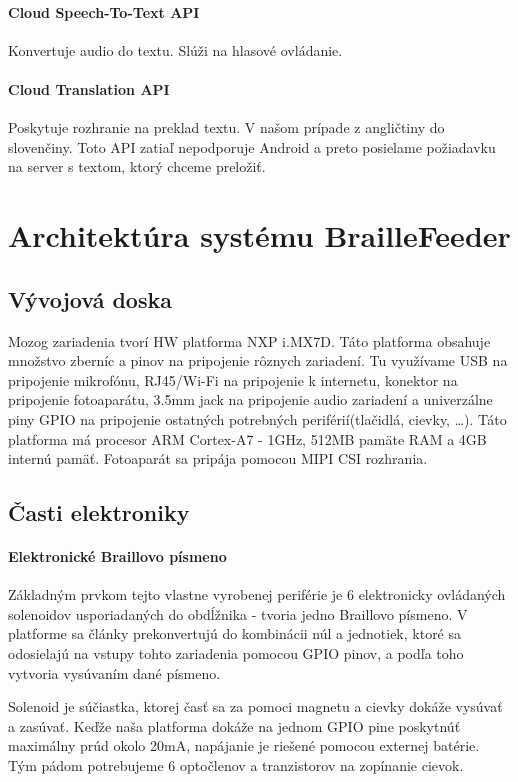 \documentclass{template/socthesis}
\begin{document}
\subsubsection{Cloud Speech-To-Text API}
Konvertuje audio do textu. Slúži na hlasové ovládanie.
\subsubsection{Cloud Translation API}
Poskytuje rozhranie na preklad textu. V našom prípade z angličtiny do slovenčiny. Toto API zatiaľ nepodporuje Android a preto posielame požiadavku na server s textom, ktorý chceme preložiť.
\newpage

\chapter{Architektúra systému BrailleFeeder}

\section{Vývojová doska}
Mozog zariadenia tvorí HW platforma NXP i.MX7D. Táto platforma obsahuje množstvo zberníc a pinov na pripojenie rôznych zariadení. Tu využívame USB na pripojenie mikrofónu, RJ45/Wi-Fi na pripojenie k internetu, konektor na pripojenie fotoaparátu, 3.5mm jack na pripojenie audio zariadení a univerzálne piny GPIO na pripojenie ostatných potrebných periférií(tlačidlá, cievky, …).
Táto platforma má procesor ARM Cortex-A7 - 1GHz, 512MB pamäte RAM a 4GB internú pamäť. Fotoaparát sa pripája pomocou MIPI CSI rozhrania.

\section{Časti elektroniky}
\subsubsection{Elektronické Braillovo písmeno}
Základným prvkom tejto vlastne vyrobenej periférie je 6 elektronicky ovládaných solenoidov usporiadaných do obdĺžnika - tvoria jedno Braillovo písmeno. V platforme sa články prekonvertujú do kombinácii núl a jednotiek, ktoré sa odosielajú na vstupy tohto zariadenia pomocou GPIO pinov, a podľa toho vytvoria vysúvaním dané písmeno. 

Solenoid je súčiastka, ktorej časť sa za pomoci magnetu a cievky dokáže vysúvať a zasúvať. Keďže naša platforma dokáže na jednom GPIO pine poskytnúť maximálny prúd okolo 20mA, napájanie je riešené pomocou externej batérie. Tým pádom potrebujeme 6 optočlenov a tranzistorov na zopínanie cievok.
\end{document}
